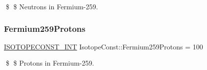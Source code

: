 \$ \$ Neutrons in Fermium-\/259. \mbox{\label{group___isotope_const-_fermium-_fm259_ga857b16ccc5e28dd0837ce2da9fcaec5f}} 
\subsubsection{\texorpdfstring{Fermium259\+Protons}{Fermium259Protons}}
{\footnotesize\ttfamily \mbox{\hyperlink{group___isotope_const-_macros_ga5f18360b3e99483a35c32d789e62621c}{I\+S\+O\+T\+O\+P\+E\+C\+O\+N\+S\+T\+\_\+\+I\+NT}} Isotope\+Const\+::\+Fermium259\+Protons = 100}

\$ \$ Protons in Fermium-\/259. 